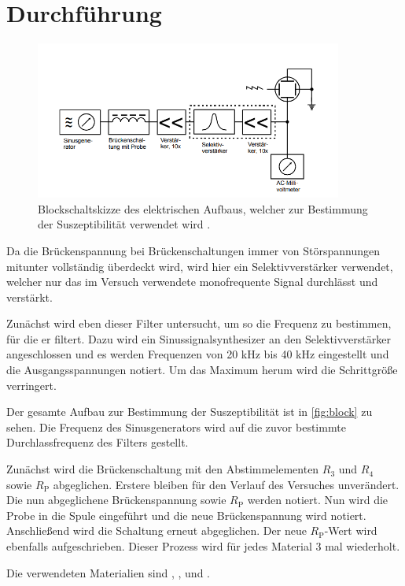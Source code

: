 \section{Durchführung}
\label{sec:Durchführung}

\begin{figure}
    \centering
    \includegraphics[width=0.90\textwidth]{content/blockschalt.png}
    \caption{Blockschaltskizze des elektrischen Aufbaus, welcher zur Bestimmung der Suszeptibilität verwendet wird \cite{V606}.}
    \label{fig:block}
\end{figure}

Da die Brückenspannung bei Brückenschaltungen immer von Störspannungen mitunter vollständig überdeckt wird,
wird hier ein Selektivverstärker verwendet, welcher nur das im Versuch verwendete monofrequente Signal durchlässt und verstärkt.

Zunächst wird eben dieser Filter untersucht, um so die Frequenz zu bestimmen, für die er filtert.
Dazu wird ein Sinussignalsynthesizer an den Selektivverstärker angeschlossen und es werden Frequenzen von 20 kHz bis 40 kHz eingestellt und die Ausgangsspannungen notiert.
Um das Maximum herum wird die Schrittgröße verringert.

Der gesamte Aufbau zur Bestimmung der Suszeptibilität ist in \autoref{fig:block} zu sehen.
Die Frequenz des Sinusgenerators wird auf die zuvor bestimmte Durchlassfrequenz des Filters gestellt.

Zunächst wird die Brückenschaltung mit den Abstimmelementen $R_3$ und $R_4$ sowie $R_\text{P}$ abgeglichen.
Erstere bleiben für den Verlauf des Versuches unverändert.
Die nun abgeglichene Brückenspannung sowie $R_\text{P}$ werden notiert.
Nun wird die Probe in die Spule eingeführt und die neue Brückenspannung wird notiert. Anschließend wird die Schaltung erneut abgeglichen.
Der neue $R_\text{P}$-Wert wird ebenfalls aufgeschrieben.
Dieser Prozess wird für jedes Material 3 mal wiederholt.

Die verwendeten Materialien sind , ,  und .